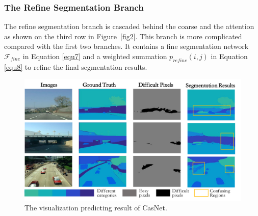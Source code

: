 \documentclass[10.5pt,compsoc]{TsT}
\theoremstyle{mystyle}
\begin{document}
{%


\subsubsection{The Refine Segmentation Branch}
\label{s:rsb}
\noindent

The refine segmentation branch is cascaded behind the coarse and the attention as shown on the third row in Figure~\ref{fig2}. This branch is more complicated compared with the first two branches. It contains a fine segmentation network $\mathcal{F}_{fine}$ in Equation \ref{equ7} and a weighted summation $p_{refine}(i,j)$ in Equation \ref{equ8} to refine the final segmentation results.

\begin{figure}[ht]
\centering
\includegraphics[width=1.9\columnwidth]{fig3.png}
\caption{The visualization predicting result of CasNet.}
\label{fig3}
\end{figure} 

}
\end{document}
